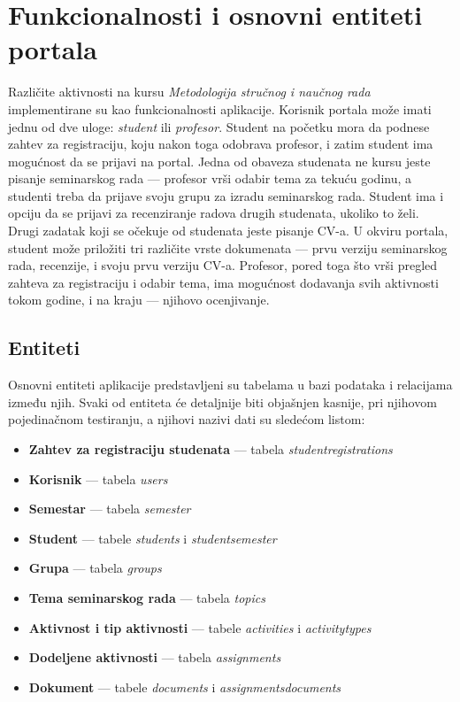 \documentclass[12pt,oneside]{memoir}
\begin{document}
\section{Funkcionalnosti i osnovni entiteti portala}
\par Različite aktivnosti na kursu \emph{Metodologija stručnog i naučnog rada} implementirane su kao funkcionalnosti aplikacije. Korisnik portala može imati jednu od dve uloge: \emph{student} ili \emph{profesor}. Student na početku mora da podnese zahtev za registraciju, koju nakon toga odobrava profesor, i zatim student ima mogućnost da se prijavi na portal. Jedna od obaveza studenata ne kursu jeste pisanje seminarskog rada --- profesor vrši odabir tema za tekuću godinu, a studenti treba da prijave svoju grupu za izradu seminarskog rada. Student ima i opciju da se prijavi za recenziranje radova drugih studenata, ukoliko to želi. Drugi zadatak koji se očekuje od studenata jeste pisanje CV-a. U okviru portala, student može priložiti tri različite vrste dokumenata --- prvu verziju seminarskog rada, recenzije, i svoju prvu verziju CV-a. Profesor, pored toga što vrši pregled zahteva za registraciju i odabir tema, ima mogućnost dodavanja svih aktivnosti tokom godine, i na kraju --- njihovo ocenjivanje.

\subsection{Entiteti}
\par Osnovni entiteti aplikacije predstavljeni su tabelama u bazi podataka i relacijama između njih. Svaki od entiteta će detaljnije biti objašnjen kasnije, pri njihovom pojedinačnom testiranju, a njihovi nazivi dati su sledećom listom: 
\begin{itemize}
\item \textbf{Zahtev za registraciju studenata} --- tabela \emph{student{\textunderscore}registrations}
\item \textbf{Korisnik} --- tabela \emph{users}
\item \textbf{Semestar} --- tabela \emph{semester}
\item \textbf{Student} --- tabele \emph{students} i \emph{student{\textunderscore}semester}
\item \textbf{Grupa}  --- tabela \emph{groups} 
\item \textbf{Tema seminarskog rada} --- tabela \emph{topics}
\item \textbf{Aktivnost i tip aktivnosti} --- tabele \emph{activities} i \emph{activity{\textunderscore}types}
\item \textbf{Dodeljene aktivnosti} --- tabela \emph{assignments}
\item \textbf{Dokument} --- tabele \emph{documents} i \emph{assignments{\textunderscore}documents}
\end{itemize}
\end{document}
